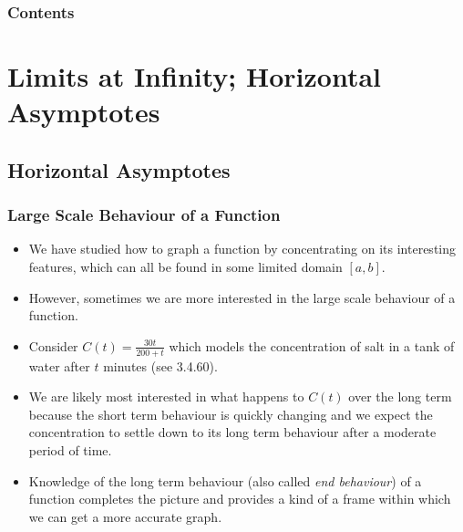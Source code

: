 \documentclass[serif,ignorenonframetext]{beamer}
\title{\commonTitleZeroThreeFour}
\subtitle{\commonSubtitleZeroThreeFour}
\author{\commonAuthor}
\institute{\commonInstitute}
\date{\commonDateZeroThreeFour}
\newcommand{\ds}{\displaystyle}
\begin{document}

\begin{frame}
  \titlepage
\end{frame}

\begin{frame}
  \frametitle{Contents}
  \tableofcontents
\end{frame}


\section{Limits at Infinity; Horizontal Asymptotes}

\subsection{Horizontal Asymptotes}

\begin{frame}
  \frametitle{Large Scale Behaviour of a Function}
  \begin{itemize}[<+->]
  \item We have studied how to graph a function
    by concentrating on its interesting features, which can
    all be found in some limited domain $[a,b]$.
  \item However, sometimes we are more interested in the large
    scale behaviour of a function.
  \item Consider $\ds C(t)=\frac{30t}{200+t}$
    which models the concentration of salt in a tank of water after
    $t$ minutes (see 3.4.60).
  \item We are likely most interested in what happens to $C(t)$ over the
    long term because the short term behaviour is quickly changing
    and we expect the concentration to settle down to
    its long term behaviour after a moderate period of time.
  \item Knowledge of the long term behaviour (also called \textit{end
    behaviour}) of a function completes the picture and provides a kind
    of a frame within which we can get a more accurate graph.
  \end{itemize}
\end{frame}
\end{document}

